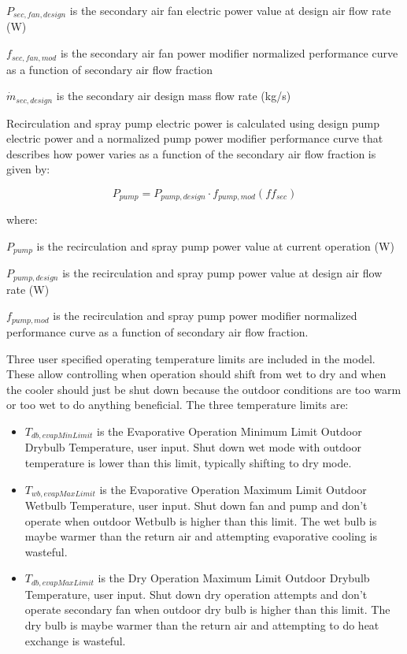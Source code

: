 \(P_{sec,fan,design}\) is the secondary air fan electric power value at design air flow rate (W)

\(f_{sec,fan,mod}\) is the secondary air fan power modifier normalized performance curve as a function of secondary air flow fraction

\(\dot{m}_{sec,design}\) is the secondary air design mass flow rate (kg/s)

Recirculation and spray pump electric power is calculated using design pump electric power and a normalized pump power modifier performance curve that describes how power varies as a function of the secondary air flow fraction is given by:

\begin{equation}
P_{pump} = P_{pump,design}\cdot f_{pump,mod}\left(ff_{sec}\right)
\end{equation}

where:

\(P_{pump}\) is the recirculation and spray pump power value at current operation (W)

\(P_{pump,design}\) is the recirculation and spray pump power value at design air flow rate (W)

\(f_{pump,mod}\) is the recirculation and spray pump power modifier normalized performance curve as a function of secondary air flow fraction.

Three user specified operating temperature limits are included in the model. These allow controlling when operation should shift from wet to dry and when the cooler should just be shut down because the outdoor conditions are too warm or too wet to do anything beneficial.  The three temperature limits are:

\begin{itemize}
\item \(T_{db,evapMinLimit}\) is the Evaporative Operation Minimum Limit Outdoor Drybulb Temperature, user input. Shut down wet mode with outdoor temperature is lower than this limit, typically shifting to dry mode.
\item \(T_{wb,evapMaxLimit}\) is the Evaporative Operation Maximum Limit Outdoor Wetbulb Temperature, user input. Shut down fan and pump and don't operate when outdoor Wetbulb is higher than this limit. The wet bulb is maybe warmer than the return air and attempting evaporative cooling is wasteful.
\item \(T_{db,evapMaxLimit}\) is the Dry Operation Maximum Limit Outdoor Drybulb Temperature, user input. Shut down dry operation attempts and don't operate secondary fan when outdoor dry bulb is higher than this limit. The dry bulb is maybe warmer than the return air and attempting to do heat exchange is wasteful.
\end{itemize}

